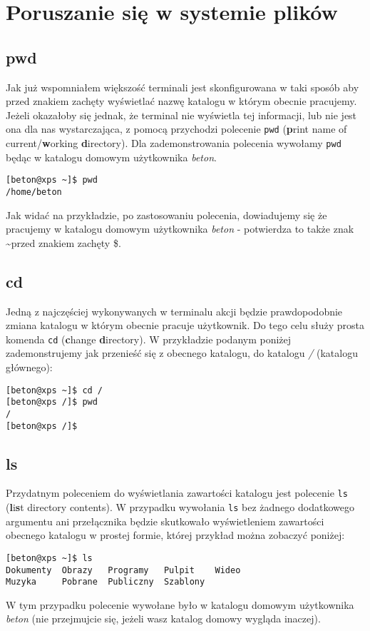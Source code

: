 \documentclass[10 pt, a4paper, draft]{report}
\begin{document}
\section{Poruszanie się w systemie plików}
\subsection{pwd}
Jak już wspomniałem większość terminali jest skonfigurowana w taki sposób aby przed znakiem zachęty wyświetlać nazwę katalogu w którym obecnie pracujemy. Jeżeli okazałoby się jednak, że terminal nie wyświetla tej informacji, lub nie jest ona dla nas wystarczająca, z pomocą przychodzi polecenie \texttt{pwd} (\textbf{p}rint name of current/\textbf{w}orking \textbf{d}irectory). Dla zademonstrowania polecenia wywołamy \texttt{pwd} będąc w katalogu domowym użytkownika \textit{beton}.
\begin{verbatim}
[beton@xps ~]$ pwd
/home/beton
\end{verbatim} 
Jak widać na przykładzie, po zastosowaniu polecenia, dowiadujemy się że pracujemy w katalogu domowym użytkownika \textit{beton} - potwierdza to także znak \textasciitilde przed znakiem zachęty \$.

\subsection{cd}
Jedną z najczęściej wykonywanych w terminalu akcji będzie prawdopodobnie zmiana katalogu w którym obecnie pracuje użytkownik. Do tego celu służy prosta komenda \texttt{cd} (\textbf{c}hange \textbf{d}irectory). W przykładzie podanym poniżej zademonstrujemy jak przenieść się z obecnego katalogu, do katalogu \textit{/} (katalogu głównego):
\begin{verbatim}
[beton@xps ~]$ cd /
[beton@xps /]$ pwd
/
[beton@xps /]$ 
\end{verbatim}

\subsection{ls}
Przydatnym poleceniem do wyświetlania zawartości katalogu jest polecenie \texttt{ls} (\textbf{l}i\textbf{s}t directory contents). W przypadku wywołania \texttt{ls} bez żadnego dodatkowego argumentu ani przełącznika będzie skutkowało wyświetleniem zawartości obecnego katalogu w prostej formie, której przykład można zobaczyć poniżej:
\begin{verbatim}
[beton@xps ~]$ ls
Dokumenty  Obrazy   Programy   Pulpit    Wideo
Muzyka     Pobrane  Publiczny  Szablony
\end{verbatim}
W tym przypadku polecenie wywołane było w katalogu domowym użytkownika \textit{beton} (nie przejmujcie się, jeżeli wasz katalog domowy wygląda inaczej). \newline
\end{document}

